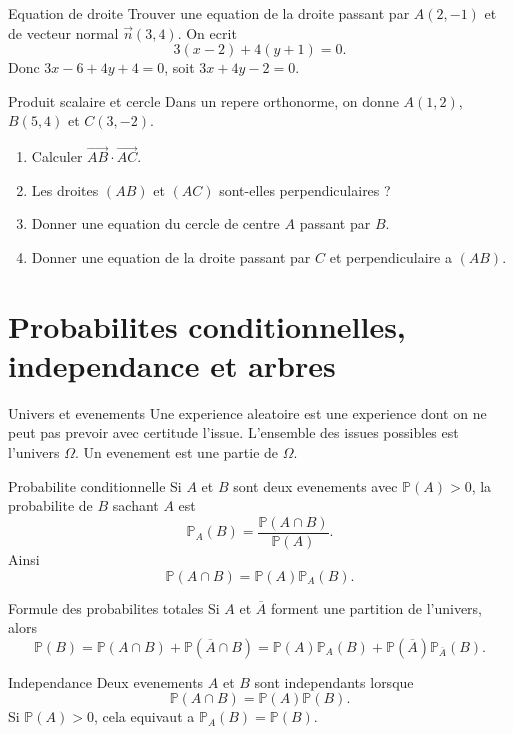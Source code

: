 \documentclass[11pt,a4paper]{article}
\newcommand{\Pp}{\mathbb{P}}
\newcommand{\vect}[1]{\overrightarrow{#1}}
\begin{document}
\begin{boiteexemple}{Equation de droite}
Trouver une equation de la droite passant par $A(2,-1)$ et de vecteur normal $\vec n(3,4)$.
On ecrit
\[
3(x-2)+4(y+1)=0.
\]
Donc $3x-6+4y+4=0$, soit $3x+4y-2=0$.
\end{boiteexemple}

\begin{exobox}{Produit scalaire et cercle}
Dans un repere orthonorme, on donne $A(1,2)$, $B(5,4)$ et $C(3,-2)$.
\begin{enumerate}
  \item Calculer $\vect{AB}\cdot\vect{AC}$.
  \item Les droites $(AB)$ et $(AC)$ sont-elles perpendiculaires ?
  \item Donner une equation du cercle de centre $A$ passant par $B$.
  \item Donner une equation de la droite passant par $C$ et perpendiculaire a $(AB)$.
\end{enumerate}
\end{exobox}


\section{Probabilites conditionnelles, independance et arbres}

\begin{boitecours}{Univers et evenements}
Une experience aleatoire est une experience dont on ne peut pas prevoir avec certitude l'issue. L'ensemble des issues possibles est l'univers $\Omega$. Un evenement est une partie de $\Omega$.
\end{boitecours}

\begin{boitecours}{Probabilite conditionnelle}
Si $A$ et $B$ sont deux evenements avec $\Pp(A)>0$, la probabilite de $B$ sachant $A$ est
\[
\Pp_A(B)=\frac{\Pp(A\cap B)}{\Pp(A)}.
\]
Ainsi
\[
\Pp(A\cap B)=\Pp(A)\Pp_A(B).
\]
\end{boitecours}

\begin{boitecours}{Formule des probabilites totales}
Si $A$ et $\overline A$ forment une partition de l'univers, alors
\[
\Pp(B)=\Pp(A\cap B)+\Pp(\overline A\cap B)
=\Pp(A)\Pp_A(B)+\Pp(\overline A)\Pp_{\overline A}(B).
\]
\end{boitecours}

\begin{boitecours}{Independance}
Deux evenements $A$ et $B$ sont independants lorsque
\[
\Pp(A\cap B)=\Pp(A)\Pp(B).
\]
Si $\Pp(A)>0$, cela equivaut a $\Pp_A(B)=\Pp(B)$.
\end{boitecours}
\end{document}
